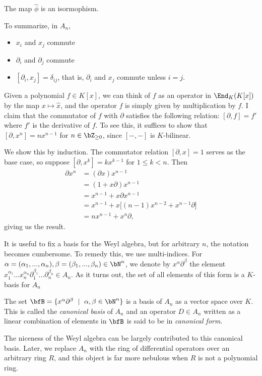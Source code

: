 \begin{thm}\label{thm:Weyl-constructions-iso}
	The map $\hat{\phi}$ is an isormophism.
\end{thm}

\noindent To summarize, in $A_n$,
\begin{itemize}
	\item $x_i$ and $x_j$ commute
	\item $\partial_i$ and $\partial_j$ commute
	\item $[\partial_i,x_j] = \delta_{ij}$, that is, $\partial_i$ and $x_j$ commute unless $i = j$.
\end{itemize}
\begin{example}\label{ex:commutator-as-derivative-one-dim}
    Given a polynomial $f \in K[x]$, we can think of $f$ as an operator in $\End_K(K[x])$ by the map $x \mapsto \hat{x}$, and the operator $f$ is simply given by multiplication by $f$. I claim that the commutator of $f$ with $\partial$ satisfies the following relation: $[\partial, f] = f'$ where $f'$ is the derivative of $f$. To see this, it suffices to show that $[\partial, x^n] = nx^{n-1}$ for $n \in \bZ_{\geq 0}$, since $[-,-]$ is $K$-bilinear.

	We show this by induction. The commutator relation $[\partial,x] = 1$ serves as the base case, so suppose $[\partial, x^k] = kx^{k-1}$ for $1\leq k < n$. Then
	\begin{align*}
		\partial x^n
		&= (\partial x)x^{n-1} \\
		&= (1 + x\partial)x^{n-1} \\
		&= x^{n-1} + x\partial x^{n-1} \\
		&= x^{n-1} + x\big[(n-1)x^{n-2}+x^{n-1}\partial\big] \\
		&= nx^{n-1} + x^n\partial,
	\end{align*}
	giving us the result.
\end{example}
It is useful to fix a basis for the Weyl algebra, but for arbitrary $n$, the notation becomes cumbersome. To remedy this, we use multi-indices. For $\alpha = (\alpha_1,...,\alpha_n), \beta = (\beta_1,...,\beta_n)\in \bN^n$, we denote by $x^\alpha\partial^\beta$ the element $x_1^{\alpha_1}...x_n^{\alpha_n}\partial_1^{\beta_1}...\partial_n^{\beta_n} \in A_n$. As it turns out, the set of all elements of this form is a $K$-basis for $A_n$
\begin{prop}\label{prop:canonical-basis}
	The set $\bfB = \{x^\alpha\partial^\beta ~ \mid ~ \alpha,\beta\in \bN^n\}$ is a basis of $A_n$ as a vector space over $K$. This is called the \emph{canonical basis} of $A_n$ and an operator $D \in A_n$ written as a linear combination of elements in $\bfB$ is said to be in \emph{canonical form}.
\end{prop}
The niceness of the Weyl algebra can be largely contributed to this canonical basis. Later, we replace $A_n$ with the ring of differential operators over an arbitrary ring $R$, and this object is far more nebulous when $R$ is not a polynomial ring.

